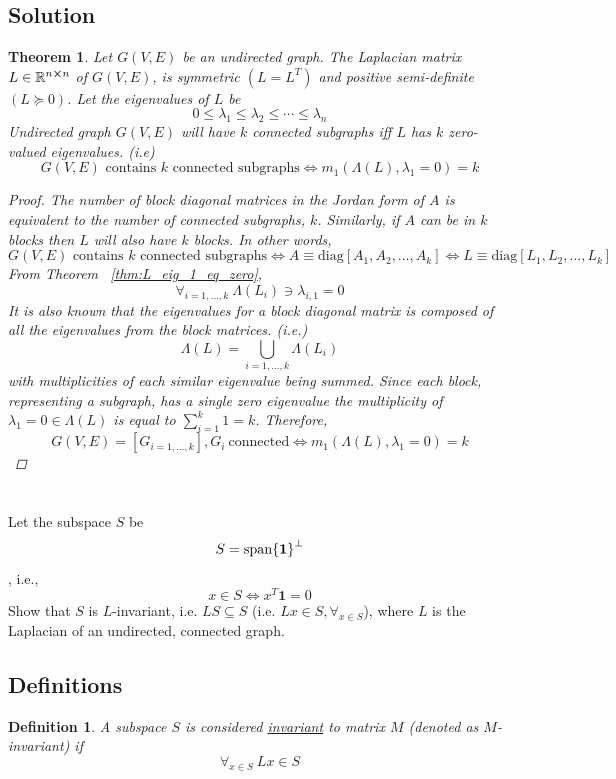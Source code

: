 \documentclass[]{article}
\numberwithin{equation}{section}
\newcommand{\R}{\mathbb{R}}
\newtheorem{definition}{Definition}
\newtheorem{theorem}{Theorem}
\begin{document}
\newpage
\subsection{Solution}
\begin{theorem}\label{thm:k_subgraphs_eq_k_zero_eig}
	Let $G(V,E)$ be an undirected graph.
	The Laplacian matrix $L\in\R^{n \cross n}$ of $G(V,E)$, is symmetric $(L=L^T)$ and positive semi-definite $(L\succeq 0)$.
	Let the eigenvalues of $L$ be\[
		0 \leq \lambda_1 \leq \lambda_2 \leq \cdots \leq \lambda_n
	\]
	Undirected graph $G(V,E)$ will have $k$ connected subgraphs iff $L$ has $k$ zero-valued eigenvalues.
	(i.e) \[
		G(V,E) \text{ contains $k$ connected subgraphs}  
		\iff m_1(\Lambda(L), \lambda_1 = 0) = k
	\]
	\begin{proof}
		The number of block diagonal matrices in the Jordan form of $A$ is equivalent to the number of connected subgraphs, $k$.
		Similarly, if $A$ can be in $k$ blocks then $L$ will also have $k$ blocks.
		In other words,\[
			G(V,E) \text{ contains $k$ connected subgraphs}  
			\iff A \equiv \text{diag}[A_1, A_2, \dots, A_k]
			\iff L \equiv \text{diag}[L_1, L_2, \dots, L_k]
		\] From Theorem \ \ref{thm:L_eig_1_eq_zero}, \[
			\forall_{i=1,\dots,k} \ \Lambda(L_{i}) \ni \lambda_{i,1} = 0
		\] It is also known that the eigenvalues for a block diagonal matrix is composed of all the eigenvalues from the block matrices. 
		(i.e.) \[
			\Lambda(L) = \bigcup_{i=1,\dots,k} \Lambda(L_{i})
		\] with  multiplicities of each similar eigenvalue being summed.
		Since each block, representing a subgraph, has a single zero eigenvalue the multiplicity of $\lambda_1 = 0 \in \Lambda(L)$ is equal to $\sum_{i=1}^{k} 1 = k$. 
		Therefore, \[
			G(V,E) = [G_{i=1,\dots,k}], G_{i} \ \text{connected} 
			\iff m_1(\Lambda(L), \lambda_1 = 0) = k
		\]
	\end{proof}
\end{theorem}

\newpage
\section{}
Let the subspace $S$ be\[
	S = \text{span}\qty{\mathbf{1}}^{\perp}
\], i.e.,\[
	x \in S \iff x^T \mathbf{1} = 0
\]
Show that $S$ is $L$-invariant, i.e. $LS \subseteq S$ (i.e. $L x \in S, \forall_{x\in S}$), where $L$ is the Laplacian of an undirected, connected graph.

\subsection{Definitions}
\begin{definition} \label{def:invariant_subspace}
	A subspace $S$ is considered \emph{\underline{invariant}} to matrix $M$ (denoted as $M$-invariant) if\[
		\forall_{x \in S} \ L x \in S
	\]
\end{definition}
\end{document}
